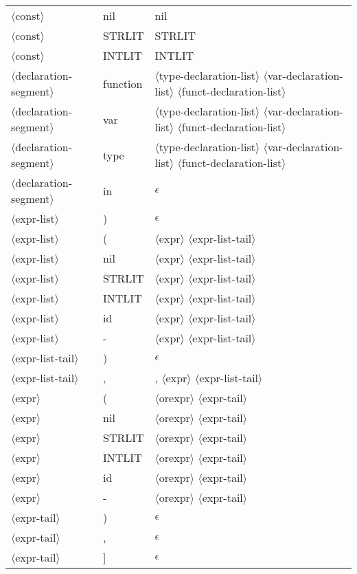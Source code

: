 \documentclass[11pt, fleqn]{article}
\newcommand{\atag}[1]{$\langle$#1$\rangle$}
\begin{document}
\begin{longtable}{l|l|l}
\atag{const}						&	nil			&	nil	\\
\atag{const}						&	STRLIT		&	STRLIT	\\
\atag{const}						&	INTLIT		&	INTLIT	\\
\atag{declaration-segment}		&	function		&	\atag{type-declaration-list}	\atag{var-declaration-list} \atag{funct-declaration-list}	\\
\atag{declaration-segment}		&	var			&	\atag{type-declaration-list}	\atag{var-declaration-list} \atag{funct-declaration-list}	\\
\atag{declaration-segment}		&	type			&	\atag{type-declaration-list}	\atag{var-declaration-list} \atag{funct-declaration-list}	\\
\atag{declaration-segment}		&	in			&	$\epsilon$	\\
\atag{expr-list}					&	)			&	$\epsilon$				\\
\atag{expr-list}					&	(			&	\atag{expr} \atag{expr-list-tail}				\\
\atag{expr-list}					&	nil			&	\atag{expr} \atag{expr-list-tail}				\\
\atag{expr-list}					&	STRLIT		&	\atag{expr} \atag{expr-list-tail}				\\
\atag{expr-list}					&	INTLIT			&	\atag{expr} \atag{expr-list-tail}				\\
\atag{expr-list}					&	id			&	\atag{expr} \atag{expr-list-tail}				\\
\atag{expr-list}					&	-			&	\atag{expr} \atag{expr-list-tail}				\\
\atag{expr-list-tail}			&	)			&	$\epsilon$								\\
\atag{expr-list-tail}			&	,			&	, \atag{expr} \atag{expr-list-tail}		\\
\atag{expr}						&	(			&	\atag{orexpr} \atag{expr-tail}	\\
\atag{expr}						&	nil			&	\atag{orexpr} \atag{expr-tail}	\\
\atag{expr}						&	STRLIT			&	\atag{orexpr} \atag{expr-tail}	\\
\atag{expr}						&	INTLIT			&	\atag{orexpr} \atag{expr-tail}	\\
\atag{expr}						&	id			&	\atag{orexpr} \atag{expr-tail}	\\
\atag{expr}						&	-			&	\atag{orexpr} \atag{expr-tail}	\\
\atag{expr-tail}					&	)		&	$\epsilon$		\\
\atag{expr-tail}					&	,		&	$\epsilon$		\\
\atag{expr-tail}					&	]		&	$\epsilon$		\\

\end{longtable}
\end{document}
